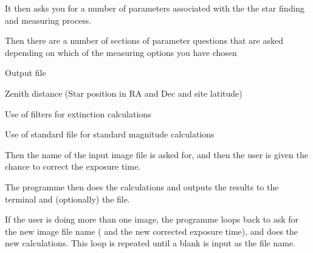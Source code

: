 {{  It then asks you for a number of parameters associated with the
  the star finding and measuring process.

  Then there are a number of sections of parameter questions that are
  asked depending on which of the measuring options you have chosen

\begin{list}{{-}}{}
    \item Output file
    \item Zenith distance (Star position in RA and Dec and site latitude)
    \item Use of filters for extinction calculations
    \item Use of standard file for standard magnitude calculations
\end{list}

  Then the name of the input image file is asked for, and then the user
  is given the chance to correct the exposure time.

  The programme then does the calculations and outputs the results to
  the terminal and (optionally) the file.

  If the user is doing more than one image, the programme loops back
  to ask for the new image file name ( and the new corrected exposure
  time), and does the new calculations. This loop is repeated until
  a blank is input as the file name.

}}

